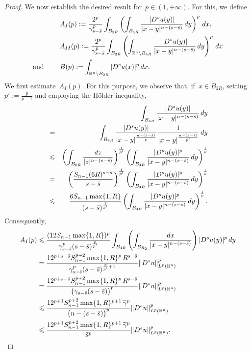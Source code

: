 \documentclass[11pt,hyp,]{nyjm}
\numberwithin{equation}{section}
\newcommand{\R}{\mathbb{R}}
\theoremstyle{remark}
\newcommand{\bs}{\Bar{s}}
\renewcommand{\leq}{\leqslant}
\renewcommand{\le}{\leqslant}
\begin{document}
\begin{proof}
			We now establish the desired result for~$p \in (1, +\infty)$.
			For this, we define
			\begin{align*}
			&A_{I}(p):= \frac{2^p}{\gamma^p_{s-\bs}} \int_{B_{2R}} \left( \int_{B_{4R}} \frac{|D^su(y)|}{|x-y|^{n-(s-\bs)}} \, dy\right)^p \, dx,  \\
			&A_{II}(p):= \frac{2^p}{\gamma^p_{s-\bs}} \int_{B_{2R}} \left (\int_{\R^n \setminus B_{4R}} \frac{|D^su(y)|}{|x-y|^{n-(s-\bs)}} \, dy\right)^p \, dx \\ {\mbox{and }} \qquad
			&B(p):= \int_{\R^n \setminus B_{2R}} |D^{\bs}u(x)|^p \, dx.
			\end{align*}
			We first estimate~$A_I(p)$. For this purpose, we observe that, if~$x \in B_{2R}$, setting~$p':=\frac{p}{p-1}$ and employing the H\"older inequality,
			\begin{eqnarray*}&&
				\int_{B_{4R}} \frac{|D^su(y)|}{|x-y|^{n-(s-\bs)}} \, dy\\& =&
				 \int_{B_{4R}} \frac{|D^su(y)|}{|x-y|^{\frac{n-(s-\bs)}{p}}} \frac{1}{|x-y|^{\frac{n-(s-\bs)}{p'}}} \, dy  \\ 
				 &\leq&  \left(\int_{B_{6R}} \frac{dz}{|z|^{n-(s-\bs)}} \right)^{\frac{1}{p'}} \left(\int_{B_{4R}} \frac{|D^s u(y)|^p}{|x-y|^{n-(s-\bs)}} \, dy \right)^{\frac{1}{p}}
				  \\ &= &\left( \frac{ S_{n-1} (6R)^{s-\bar{s}}}{s-\bs}\right)^{\frac{1}{p'}} \left(\int_{B_{4R}} \frac{|D^s u(y)|^p}{|x-y|^{n-(s-\bs)}} \, dy \right)^{\frac{1}{p}}  
\\ &\le &
\frac{ 6S_{n-1} \max\{1,R\} }{(s - \bar{s})^{\frac{1}{p'}}} \left(\int_{B_{4R}} \frac{|D^s u(y)|^p}{|x-y|^{n-(s-\bs)}} \, dy \right)^{\frac{1}{p}}. 
\end{eqnarray*}
Consequently, 
\begin{equation*}\begin{split}
A_I(p)& \leq \frac{(12 S_{n-1} \max\{1,R\})^p}{\gamma^p_{s-\bs}(s-\bs)^{\frac{p}{p'}}} \int_{B_{4R}} \left(\int_{B_{R_2}} \frac{dx}{|x-y|^{n-(s-\bs)}}  \right) |D^s u(y)|^p\, dy \\ &
=\frac{12^{p+s-\bar{s}} S_{n-1}^{p+2} \max\{1,R\}^p\,R^{s-\bar s}}{\gamma^p_{s-\bs}(s-\bs)^{\frac{p}{p'}+1}}  \Vert D^s u \Vert^p_{L^p(\R^n)}
\\&=\frac{12^{p+s-\bar{s}} S_{n-1}^{p+2} \max\{1,R\}^p\,R^{s-\bar s}}{\big(\gamma_{s-\bs}(s-\bs)\big)^p} \Vert D^s u \Vert^p_{L^p(\R^n)}\\&
\le\frac{12^{p+1} S_{n-1}^{p+2} \max\{1,R\}^{p+1}\,\widetilde\gamma^p}{\big(n-(s-\bar s)\big)^p} \Vert D^s u \Vert^p_{L^p(\R^n)}\\&\le
\frac{12^{p+1} S_{n-1}^{p+2} \max\{1,R\}^{p+1}\,\widetilde\gamma^p}{\bar{s}^p} \Vert D^s u \Vert^p_{L^p(\R^n)}
.
			\end{split}\end{equation*}
			

\end{proof}
\end{document}
